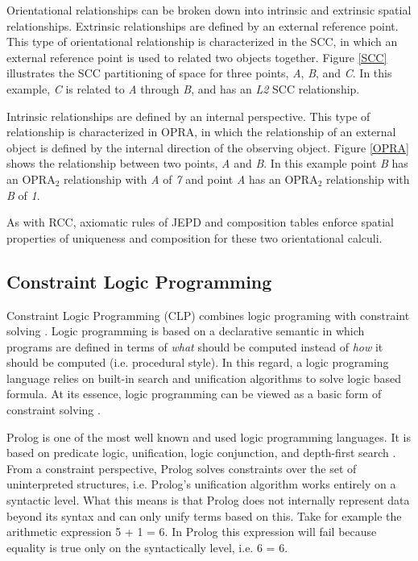 \documentclass[12pt]{ucthesis}
\begin{document}
Orientational relationships can be broken down into intrinsic and extrinsic spatial relationships. Extrinsic relationships are defined by  an external reference point. This type of orientational relationship is characterized in the SCC, in which an external reference point is used to related two objects together. Figure \ref{SCC} illustrates the SCC partitioning of space for three points, \emph{A}, \emph{B}, and \emph{C}. In this example, \emph{C} is related to \emph{A} through \emph{B}, and has an \emph{L2} SCC relationship. 

Intrinsic relationships are defined by an internal perspective. This type of relationship is characterized in OPRA, in which the relationship of an external object is defined by the internal direction of the observing object. Figure \ref{OPRA} shows the relationship between two points, \emph{A} and \emph{B}. In this example point \emph{B} has an OPRA$_{2}$ relationship with \emph{A} of \emph{7} and point \emph{A} has an OPRA$_{2}$ relationship with \emph{B} of \emph{1}. 

As with RCC, axiomatic rules of JEPD and composition tables enforce spatial properties of uniqueness and composition for these two orientational calculi.

\subsection{Constraint Logic Programming}
Constraint Logic Programming (CLP) combines logic programing with constraint solving \cite{GavanelliCLP} \cite{WallaceCLP} \cite{Jaffar:1987:CLP}. Logic programming is based on a declarative semantic in which programs are defined in terms of \emph{what} should be computed instead of \emph{how} it should be computed (i.e. procedural style). In this regard, a logic programing language relies on built-in search and unification algorithms to solve logic based formula. At its essence, logic programming can be viewed as a basic form of constraint solving \cite{GavanelliCLP}. 

Prolog is one of the most well known and used logic programming languages. It is based on predicate logic, unification, logic conjunction, and depth-first search \cite{Sterling:1986}. From a constraint perspective, Prolog solves constraints over the set of uninterpreted structures, i.e. Prolog's unification algorithm works entirely on a syntactic level. What this means is that Prolog does not internally 
represent data beyond its syntax and can only unify terms based on this. Take for example the arithmetic expression 5 + 1 = 6. In Prolog this expression will fail because equality is true only on the syntactically level, i.e. 6 = 6.  
\end{document}
